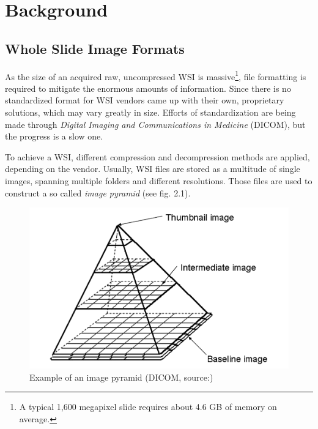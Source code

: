 \chapter{Background}
\section{Whole Slide Image Formats}
As the size of an acquired raw, uncompressed WSI is massive\footnote{ A typical 1,600 megapixel slide requires about 4.6 GB of memory on average\cite{Farahanil15}.}, file formatting is required to mitigate the enormous amounts of information. Since there is no standardized format for WSI vendors came up with their own, proprietary solutions, which may vary greatly in size\cite{Cornish13}. Efforts of standardization are being made through \emph{Digital Imaging and Communications in Medicine} (DICOM), but the progress is a slow one\cite{Farahanil15}.

To achieve a WSI, different compression and decompression methods are applied, depending on the vendor\cite{Farahanil15}. Usually, WSI files are stored as a multitude of single images, spanning multiple folders and different resolutions. Those files are used to construct a so called \emph{image pyramid}\cite{Farahanil15} (see fig. 2.1).

\begin{figure}[H]
	\begin{center}
		\includegraphics[scale=0.2]{img/imgPyramid.png}
		\caption{Example of an image pyramid (DICOM, source:\cite{Singh11})}
		\label{fig:fig2.1}
	\end{center}
\end{figure}

